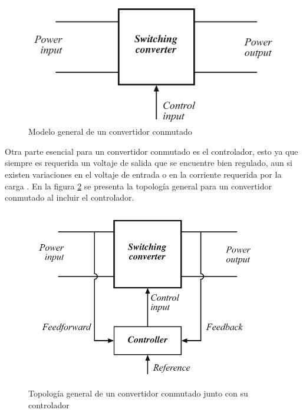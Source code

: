 \begin{figure}[H]
   \centering
   \includegraphics[scale=.4]{imagenes/switching converter.png}
   \caption{Modelo general de un convertidor conmutado \cite{erickson_fundamentals_2020}}
   \label{fig:switching}
\end{figure}

Otra parte esencial para un convertidor conmutado es el controlador,  esto ya que siempre es requerida
un voltaje de salida que se encuentre bien regulado, aun si existen variaciones en el voltaje de entrada
o en la corriente requerida por la carga \cite{erickson_fundamentals_2020}. En la figura \ref{fig:controlador} se 
presenta la topología general para un convertidor conmutado al incluir el controlador. 

\begin{figure}[H]
    \centering
    \includegraphics[scale=0.4]{imagenes/topologia.png}
    \caption{Topología general de un convertidor conmutado junto con su controlador \cite{erickson_fundamentals_2020}}
    \label{fig:controlador}
\end{figure}

